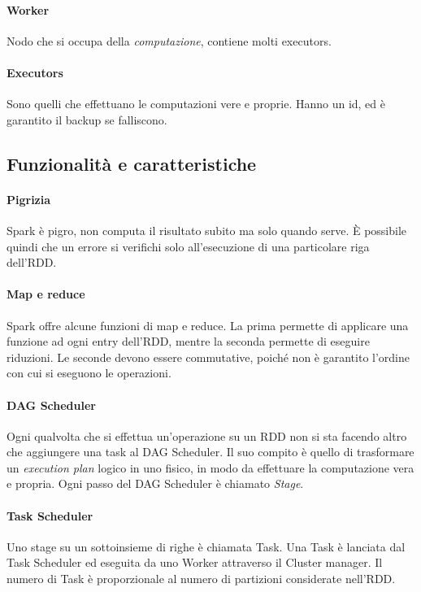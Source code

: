 \paragraph{Worker}
Nodo che si occupa della \emph{computazione}, contiene molti executors.

\paragraph{Executors}
Sono quelli che effettuano le computazioni vere e proprie. Hanno un id, ed è 
garantito il backup se falliscono.

\subsection{Funzionalità e caratteristiche}

\paragraph{Pigrizia}
Spark è pigro, non computa il risultato subito ma solo quando serve. 
È possibile quindi che un errore si verifichi solo all'esecuzione di una particolare 
riga dell'RDD.

\paragraph{Map e reduce}
Spark offre alcune funzioni di map e reduce. La prima permette di applicare una funzione
ad ogni entry dell'RDD, mentre la seconda permette di eseguire riduzioni. Le seconde devono essere
commutative, poiché non è garantito l'ordine con cui si eseguono le operazioni.

\paragraph{DAG Scheduler}
Ogni qualvolta che si effettua un'operazione su un RDD non si sta facendo altro che 
aggiungere una task al DAG Scheduler. Il suo compito è quello di trasformare un 
\emph{execution plan} logico in uno fisico, in modo da effettuare la computazione vera e propria.
Ogni passo del DAG Scheduler è chiamato \emph{Stage}.

\paragraph{Task Scheduler}
Uno stage su un sottoinsieme di righe è chiamata Task.
Una Task è lanciata dal Task Scheduler ed eseguita da uno Worker 
attraverso il Cluster manager. Il numero 
di Task è proporzionale al numero di partizioni considerate nell'RDD.

